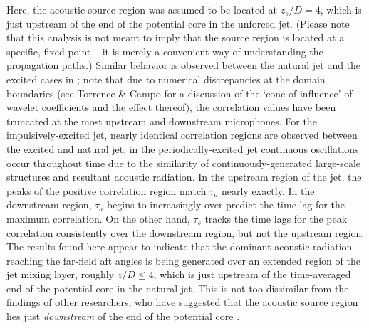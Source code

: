 Here, the acoustic source region was assumed to be located at $z_s /D = 4$, which is just upstream of the end of the potential core in the unforced jet. 
(Please note that this analysis is not meant to imply that the source region is located at a specific, fixed point – it is merely a convenient way of understanding the propagation paths.)
Similar behavior is observed between the natural jet and the excited cases in ; note that due to numerical discrepancies at the domain boundaries (see Torrence \& Campo \citep{Torrence1998} for a discussion of the `cone of influence' of wavelet coefficients and the effect thereof), the correlation values have been truncated at the most upstream and downstream microphones.
For the impulsively-excited jet, nearly identical correlation regions are observed between the excited and natural jet; in the periodically-excited jet continuous oscillations occur throughout time due to the similarity of continuously-generated large-scale structures and resultant acoustic radiation.
In the upstream region of the jet, the peaks of the positive correlation region match $\tau_a$ nearly exactly. 
In the downstream region, $\tau_a$ begins to increasingly over-predict the time lag for the maximum correlation. 
On the other hand, $\tau_s$ tracks the time lags for the peak correlation consistently over the downstream region, but not the upstream region. 
The results found here appear to indicate that the dominant acoustic radiation reaching the far-field aft angles is being generated over an extended region of the jet mixing layer, roughly $z/D \leq 4$, which is just upstream of the time-averaged end of the potential core in the natural jet.
This is not too dissimilar from the findings of other researchers, who have suggested that the acoustic source region lies just \textit{downstream} of the end of the potential core \citep{Hileman2005}.
